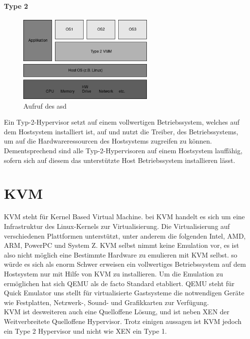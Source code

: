 \documentclass[14pt]{extreport}
\begin{document}
\subsubsection{Type 2}
\begin{figure}
	\begin{center}
		\includegraphics[width=0.6\textwidth]{png/VMMType2.png}
		\caption{Aufruf des asd}
		\label{fig:as}
	\end{center}
\end{figure}
Ein Typ-2-Hypervisor setzt auf einem vollwertigen Betriebssystem, welches auf dem Hostsystem installiert ist, auf und nutzt die Treiber, des Betriebssystems, um auf die Hardwareressourcen des Hostsystems zugreifen zu können. Dementsprechend sind alle Typ-2-Hypervisoren auf einem Hostsystem lauffähig, sofern sich auf diesem das unterstützte Host Betriebssystem installieren lässt.
\chapter{KVM}
KVM steht für Kernel Based Virtual Machine. bei KVM handelt es sich um eine Infrastruktur des Linux-Kernels zur Virtualisierung. Die Virtualisierung auf verschiedenen Plattformen unterstützt, unter anderem die folgenden Intel, AMD, ARM, PowerPC und System Z. KVM selbst nimmt keine Emulation vor, es ist also nicht möglich eine Bestimmte Hardware zu emulieren mit KVM selbst. so würde es sich als enorm Schwer erweisen ein vollwertiges Betriebssystem auf dem Hostsystem nur mit Hilfe von KVM zu installieren. Um die Emulation zu ermöglichen hat sich QEMU als de facto Standard etabliert. QEMU steht für Quick Emulator uns stellt für virtualisierte Gastsysteme die notwendigen Geräte wie Festplatten, Netzwerk-, Sound- und Grafikkarten zur Verfügung.\\
KVM ist desweiteren auch eine Quelloffene Lösung, und ist neben XEN der Weitverbreitete Quelloffene Hypervisor. Trotz einigen aussagen ist KVM jedoch ein Type 2 Hypervisor und nicht wie XEN ein Type 1.
\end{document}
